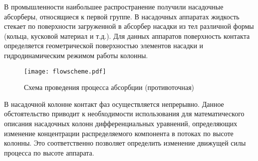 В промышленности наибольшее распространение получили насадочные абсорберы, относящиеся к первой группе. В насадочных аппаратах жидкость стекает по поверхности загруженной в абсорбер насадки из тел различной формы (кольца, кусковой материал и т.д.). Для данных аппаратов поверхность контакта определяется геометрической поверхностью элементов насадки и гидродинамическим режимом работы колонны.
\begin{wrapfigure}{H}{0.5\textwidth}
	\begin{center}
		\texttt{[image: flowscheme.pdf]}
	\end{center}
	\caption{ Схема проведения процесса абсорбции (противоточная)} \label{fig:mass.sheme}
\end{wrapfigure}

В насадочной колонне контакт фаз осуществляется непрерывно. Данное обстоятельство приводит к необходимости использования для математического описания насадочных колонн дифференциальных уравнений, определяющих изменение концентрации распределяемого компонента в потоках по высоте колонны. Это соответственно позволяет определить изменение движущей силы процесса по высоте аппарата.


